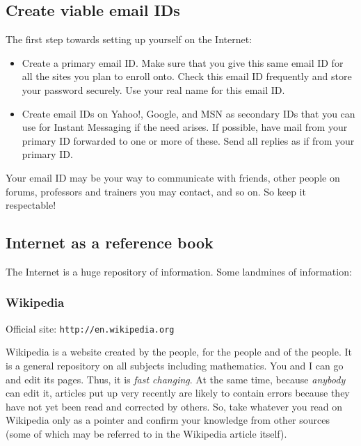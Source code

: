 \documentclass[a4paper]{amsart}
\begin{document}
\subsection{Create viable email IDs}

The first step towards setting up yourself on the Internet:

\begin{itemize}

\item Create a primary email ID. Make sure that you give this same email ID for all the sites you plan to enroll onto. Check this
  email ID frequently and store your password securely. Use your real name for this email ID.

\item Create email IDs on Yahoo!, Google, and MSN as secondary IDs that you can use for Instant Messaging if the need arises. If possible,
  have mail from your primary ID forwarded to one or more of these. Send all replies as if from your primary ID.

\end{itemize}

Your email ID may be your way to communicate with friends, other people on forums, professors and trainers you may contact, and so on.
So keep it respectable!

\subsection{Internet as a reference book}

The Internet is a huge repository of information. Some landmines of information:

\subsubsection{Wikipedia}

Official site: 
{\tt http://en.wikipedia.org}

Wikipedia is a website created by the people, for the people and of the people. 
It is a general repository on all subjects including mathematics.
You and I can go and edit its pages.
Thus, it is {\em fast changing}. At the same time, because {\em anybody} can edit it, articles put up very recently are likely
to contain errors because they have not yet been read and corrected by others. So, take whatever you read on Wikipedia
only as a pointer and confirm your knowledge from other sources (some of which may be referred to in the Wikipedia article itself).
\end{document}
